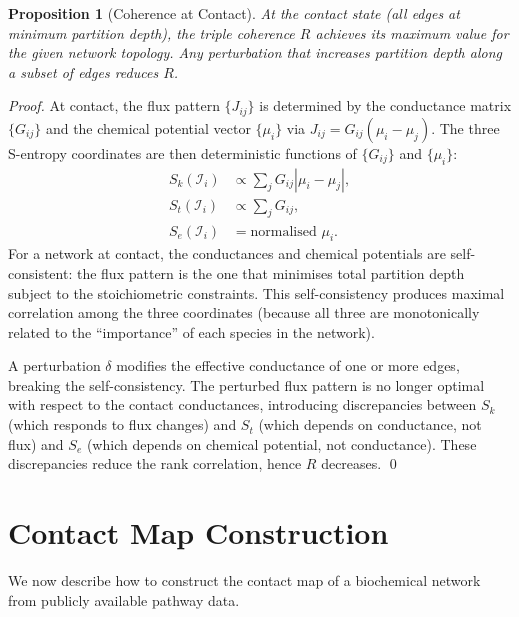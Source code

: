 \documentclass[11pt,twocolumn]{article}
\theoremstyle{plain}
\newtheorem{proposition}[theorem]{Proposition}
\theoremstyle{definition}
\newcommand{\Sk}{S_k}
\newcommand{\St}{S_t}
\newcommand{\Se}{S_e}
\begin{document}
\begin{proposition}[Coherence at Contact]
\label{prop:coherence_contact}
At the contact state (all edges at minimum partition depth), the triple coherence
$R$ achieves its maximum value for the given network topology. Any perturbation
that increases partition depth along a subset of edges reduces $R$.
\end{proposition}

\begin{proof}
At contact, the flux pattern $\{J_{ij}\}$ is determined by the conductance
matrix $\{G_{ij}\}$ and the chemical potential vector $\{\mu_i\}$ via
$J_{ij} = G_{ij}(\mu_i - \mu_j)$. The three S-entropy coordinates are then
deterministic functions of $\{G_{ij}\}$ and $\{\mu_i\}$:
\begin{align}
  \Sk(\mathcal{I}_i) &\propto \sum_j G_{ij} |\mu_i - \mu_j|, \\
  \St(\mathcal{I}_i) &\propto \sum_j G_{ij}, \\
  \Se(\mathcal{I}_i) &= \text{normalised } \mu_i.
\end{align}
For a network at contact, the conductances and chemical potentials are
self-consistent: the flux pattern is the one that minimises total partition depth
subject to the stoichiometric constraints. This self-consistency produces maximal
correlation among the three coordinates (because all three are monotonically
related to the ``importance'' of each species in the network).

A perturbation $\delta$ modifies the effective conductance of one or more edges,
breaking the self-consistency. The perturbed flux pattern is no longer optimal
with respect to the contact conductances, introducing discrepancies between
$\Sk$ (which responds to flux changes) and $\St$ (which depends on
conductance, not flux) and $\Se$ (which depends on chemical potential, not
conductance). These discrepancies reduce the rank correlation, hence $R$
decreases. \qed
\end{proof}


\section{Contact Map Construction}
\label{sec:construction}

We now describe how to construct the contact map of a biochemical network from
publicly available pathway data.
\end{document}
